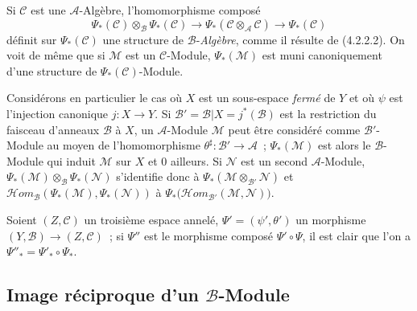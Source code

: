\begin{env}[4.2.4]
\label{0.4.2.4-fr}
Si $\mathcal{C}$ est une $\mathcal{A}$-Algèbre, l'homomorphisme composé
\[
  \Psi_*(\mathcal{C})\otimes_{\mathcal{B}}\Psi_*(\mathcal{C})
  \longrightarrow
  \Psi_*(\mathcal{C}\otimes_{\mathcal{A}}\mathcal{C})
  \longrightarrow
  \Psi_*(\mathcal{C})
\]
définit sur $\Psi_*(\mathcal{C})$ une structure de $\mathcal{B}$-\emph{Algèbre},
comme il résulte de (4.2.2.2). On voit de même que si $\mathcal{M}$ est un
$\mathcal{C}$-Module, $\Psi_*(\mathcal{M})$ est muni canoniquement d'une
structure de $\Psi_*(\mathcal{C})$-Module.
\end{env}

\begin{env}[4.2.5]
\label{0.4.2.5-fr}
Considérons en particulier le cas où $X$ est un sous-espace \emph{fermé} de
$Y$ et où $\psi$ est l'injection canonique $j:X\to Y$. Si
$\mathcal{B}'=\mathcal{B}|X=j^*(\mathcal{B})$ est la restriction du faisceau
d'anneaux $\mathcal{B}$ à $X$, un $\mathcal{A}$-Module $\mathcal{M}$ peut
être considéré comme $\mathcal{B}'$-Module au moyen de l'homomorphisme
$\theta^\sharp:\mathcal{B}'\to\mathcal{A}$~; $\Psi_*(\mathcal{M})$ est alors
le $\mathcal{B}$-Module qui induit $\mathcal{M}$ sur $X$ et $0$ ailleurs. Si
$\mathcal{N}$ est un second $\mathcal{A}$-Module,
$\Psi_*(\mathcal{M})\otimes_{\mathcal{B}}\Psi_*(\mathcal{N})$ s'identifie
donc à $\Psi_*(\mathcal{M}\otimes_{\mathcal{B}'}\mathcal{N})$ et
$\mathcal{H}\!om_{\mathcal{B}}(\Psi_*(\mathcal{M}),\Psi_*(\mathcal{N}))$
à
$\Psi_*\bigl(\mathcal{H}\!om_{\mathcal{B}'}(\mathcal{M},\mathcal{N})\bigr)$.
\end{env}

\begin{env}[4.2.6]
\label{0.4.2.6-fr}
Soient $(Z,\mathcal{C})$ un troisième espace annelé,
$\Psi'=(\psi',\theta')$ un morphisme
$(Y,\mathcal{B})\to(Z,\mathcal{C})$~; si $\Psi''$ est le morphisme composé
$\Psi'\circ\Psi$, il est clair que l'on a
$\Psi''_*=\Psi'_*\circ\Psi_*$.
\end{env}

\subsection{Image réciproque d'un $\mathcal{B}$-Module}
\label{subsection:0.4.3-fr}

